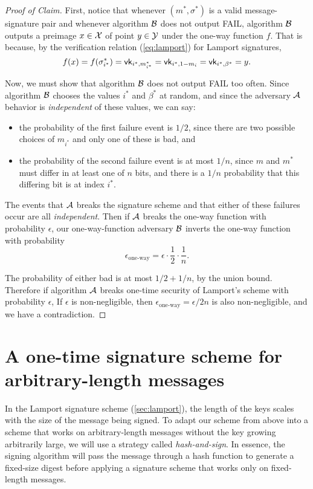\begin{proof}[Proof of Claim]
First, notice that whenever $(m^*, \sigma^*)$ is a valid message-signature
pair and whenever algorithm $\mathcal{B}$ does not output FAIL, algorithm $\mathcal{B}$
outputs a preimage $x \in \mathcal{X}$ of point $y \in \mathcal{Y}$ under the one-way function $f$.
That is because, by the verification relation (\ref{eq:lamport}) for Lamport signatures,
\[f(x) = f(\sigma^*_{i^*}) = \mathsf{vk}_{i^*,m^*_{i^*}} = \mathsf{vk}_{i^*, 1 - m_i} = \mathsf{vk}_{i^*, \beta^*} = y.\]

Now, we must show that algorithm $\mathcal{B}$ does not output FAIL too often.
Since algorithm $\mathcal{B}$ chooses the values $i^*$ and $\beta^*$ at random,
and since the adversary $\mathcal{A}$ behavior is \emph{independent} of these values,
we can say:
  \begin{itemize}
    \item the probability of the first failure event is $1/2$,
          since there are two possible choices of $m_{i^*}$ and only 
          one of these is bad, and 
    \item the probability of the second failure event is at most $1/n$,
          since $m$ and $m^*$ must differ in at least one of $n$ bits,
          and there is a $1/n$ probability that this differing bit is
          at index $i^*$.
  \end{itemize}

The events that $\mathcal{A}$ breaks the signature scheme
and that either of these failures occur are all \emph{independent}.
Then if $\mathcal{A}$ breaks the one-way function with probability $\epsilon$,
our one-way-function adversary $\mathcal{B}$
inverts the one-way function with probability
\[ \epsilon_\text{one-way} = \epsilon \cdot \frac{1}{2} \cdot \frac{1}{n}.\]

The probability of either bad is at most $1/2 + 1/n$,
by the union bound.
Therefore if algorithm $\mathcal{A}$ breaks one-time security of Lamport's
scheme with probability $\epsilon$,
If $\epsilon$ is non-negligible, then $\epsilon_\text{one-way} = \epsilon/2n$
is also non-negligible, and we have a contradiction.
\end{proof}


\section{A one-time signature scheme for arbitrary-length messages}
In the Lamport signature scheme (\cref{sec:lamport}), the length of the keys scales with the size of the message being signed.
To adapt our scheme from above into a scheme that works on arbitrary-length messages without the key growing arbitrarily large, we will use a strategy called \emph{hash-and-sign}.
In essence, the signing algorithm will pass the message through a hash function to generate a fixed-size digest before applying a signature
scheme that works only on fixed-length messages.


